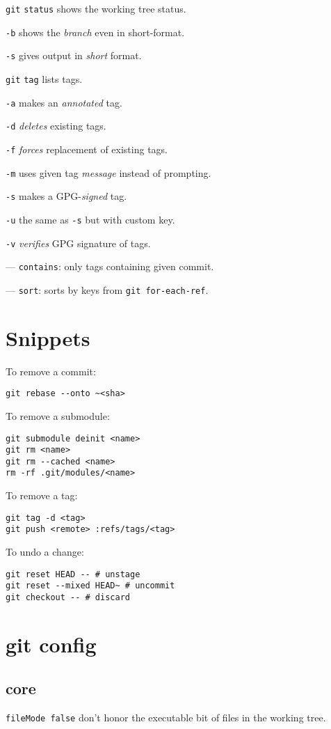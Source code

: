 \documentclass{reference_card}
\begin{document}
\begin{multicols*}{3}
\begin{compactenum}
\item [\texttt{git}] \texttt{status} shows the working tree status.
\item [\texttt{-b}] shows the \emph{branch} even in short-format.
\item [\texttt{-s}] gives output in \emph{short} format.
\end{compactenum}

\begin{compactenum}
\item [\texttt{git}] \texttt{tag} lists tags.
\item [\texttt{-a}] makes an \emph{annotated} tag.
\item [\texttt{-d}] \emph{deletes} existing tags.
\item [\texttt{-f}] \emph{forces} replacement of existing tags.
\item [\texttt{-m}] uses given tag \emph{message} instead of prompting.
\item [\texttt{-s}] makes a GPG-\emph{signed} tag.
\item [\texttt{-u}] the same as \texttt{-s} but with custom key.
\item [\texttt{-v}] \emph{verifies} GPG signature of tags.
\item [---] \texttt{contains}: only tags containing given commit.
\item [---] \texttt{sort}: sorts by keys from \texttt{git for-each-ref}.
\end{compactenum}

\section*{Snippets}
To remove a commit:
\begin{verbatim}
git rebase --onto ~<sha>
\end{verbatim}

To remove a submodule:
\begin{verbatim}
git submodule deinit <name>
git rm <name>
git rm --cached <name>
rm -rf .git/modules/<name>
\end{verbatim}

To remove a tag:
\begin{verbatim}
git tag -d <tag>
git push <remote> :refs/tags/<tag>
\end{verbatim}

To undo a change:
\begin{verbatim}
git reset HEAD -- # unstage
git reset --mixed HEAD~ # uncommit
git checkout -- # discard
\end{verbatim}

\section*{git config}
\subsection*{core}
\texttt{fileMode false} don't honor the executable bit of files in the working tree.
\end{multicols*}
\end{document}
